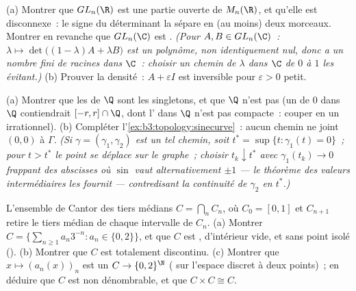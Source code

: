 \begin{exercise}[$\star\star$]\label{exo:b3:topology:8}
(a) Montrer que $GL_n(\R)$ est une partie ouverte  de
$M_n(\R)$, et qu'elle est disconnexe~: le signe du déterminant
la sépare en (au moins) deux morceaux. Montrer en revanche que
$GL_n(\C)$ est .
\emph{(Pour $A, B \in GL_n(\C)$~: $\lambda \mapsto
\det\bigl((1 - \lambda)A + \lambda B\bigr)$ est un polynôme,
non identiquement nul, donc a un nombre fini de racines dans
$\C$~: choisir un chemin de $\lambda$ dans $\C$ de $0$ à $1$
les évitant.)}
(b) Prouver la densité~: $A + \varepsilon I$ est inversible
pour $\varepsilon > 0$ petit.
\end{exercise}

\begin{exercise}[$\star\star$]\label{exo:b3:topology:9}
(a) Montrer que les  de $\Q$ sont les
singletons, et que $\Q$ n'est pas  (un
  de $0$ dans $\Q$ contiendrait $[-r, r]\cap
\Q$, dont l' dans $\Q$ n'est pas compacte~: couper en
un irrationnel).
(b) Compléter l'\cref{ex:b3:topology:sinecurve}~: aucun chemin
ne joint $(0,0)$ à $\Gamma$. \emph{(Si $\gamma = (\gamma_1,
\gamma_2)$ est un tel chemin, soit $t^* = \sup\{t :
\gamma_1(t) = 0\}$~; pour $t > t^*$ le point se déplace sur le
graphe~; choisir $t_k \downarrow t^*$ avec $\gamma_1(t_k) \to
0$ frappant des abscisses où $\sin$ vaut alternativement
$\pm1$ --- le théorème des valeurs intermédiaires les fournit
--- contredisant la continuité de $\gamma_2$ en $t^*$.)}
\end{exercise}

\begin{exercise}[$\star\star\star$]\label{exo:b3:topology:10}
L'ensemble de Cantor des tiers médians $C = \bigcap_n C_n$, où
$C_0 = [0,1]$ et $C_{n+1}$ retire le tiers médian  de
chaque intervalle de $C_n$.
(a) Montrer $C = \bigl\{\sum_{n\geq1} a_n3^{-n} : a_n \in
\{0,2\}\bigr\}$, et que $C$ est , d'intérieur vide, et
sans point isolé (\emph{}).
(b) Montrer que $C$ est totalement discontinu.
(c) Montrer que $x \mapsto (a_n(x))_n$ est un 
$C \to \{0,2\}^\N$ ( sur l'espace discret à
deux points)~; en déduire que $C$ est non dénombrable, et que
$C \times C \cong C$.
\end{exercise}

